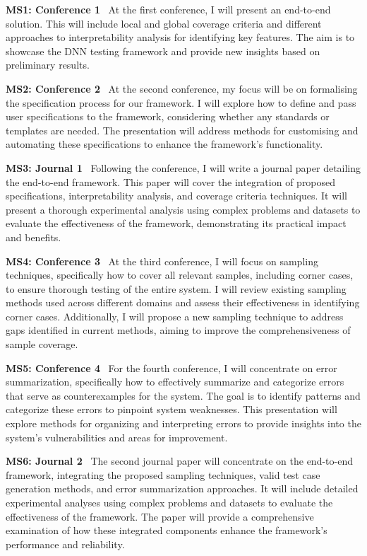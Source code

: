 \noindent \textbf{MS1: Conference 1} \
At the first conference, I will present an end-to-end solution. This will include local and global coverage criteria and different approaches to interpretability analysis for identifying key features. The aim is to showcase the DNN  testing framework and provide new insights based on preliminary results.

\noindent \textbf{MS2: Conference 2} \
At the second conference, my focus will be on formalising the specification process for our framework. I will explore how to define and pass user specifications to the framework, considering whether any standards or templates are needed. The presentation will address methods for customising and automating these specifications to enhance the framework’s functionality.

\noindent \textbf{MS3: Journal 1} \
Following the conference, I will write a journal paper detailing the end-to-end framework. This paper will cover the integration of proposed specifications, interpretability analysis, and coverage criteria techniques. It will present a thorough experimental analysis using complex problems and datasets to evaluate the effectiveness of the framework, demonstrating its practical impact and benefits.

\noindent \textbf{MS4: Conference 3} \
At the third conference, I will focus on sampling techniques, specifically how to cover all relevant samples, including corner cases, to ensure thorough testing of the entire system. I will review existing sampling methods used across different domains and assess their effectiveness in identifying corner cases. Additionally, I will propose a new sampling technique to address gaps identified in current methods, aiming to improve the comprehensiveness of sample coverage.

\noindent \textbf{MS5: Conference 4} \
For the fourth conference, I will concentrate on error summarization, specifically how to effectively summarize and categorize errors that serve as counterexamples for the system. The goal is to identify patterns and categorize these errors to pinpoint system weaknesses. This presentation will explore methods for organizing and interpreting errors to provide insights into the system's vulnerabilities and areas for improvement.

\noindent \textbf{MS6: Journal 2 } \
The second journal paper will concentrate on the end-to-end framework, integrating the proposed sampling techniques, valid test case generation methods, and error summarization approaches. It will include detailed experimental analyses using complex problems and datasets to evaluate the effectiveness of the framework. The paper will provide a comprehensive examination of how these integrated components enhance the framework's performance and reliability.

